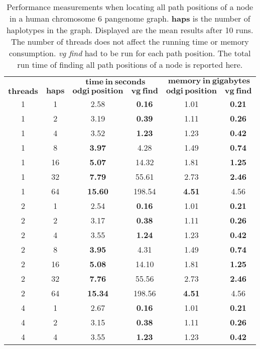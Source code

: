 \begin{table}[!ht]
	\centering
	\caption{\label{tab:position} Performance measurements when locating all path positions of a node in a human chromosome 6 pangenome graph. \textbf{haps} is the number of haplotypes in the graph. Displayed are the mean results after 10 runs. The number of threads does not affect the running time or memory consumption. \textit{vg find} had to be run for each path position. The total run time of finding all path positions of a node is reported here.}
	\begin{tabular}{@{}cccccc@{}}
		& & \multicolumn{2}{c}{$\mathbf{time\ in\ seconds}$} & \multicolumn{2}{c}{$\mathbf{memory\ in\ gigabytes}$} \\ \cmidrule(lr){3-4} \cmidrule(lr){5-6}
		{$\mathbf{threads}$} & {$\mathbf{haps}$} & {$\mathbf{odgi\ position}$} & {$\mathbf{vg\ find}$} & {$\mathbf{odgi\ position}$} & {$\mathbf{vg\ find}$} \\ \hline
		1 & 1 & 2.58 & \textbf{0.16} & 1.01 & \textbf{0.21} \\ 
		1 & 2 & 3.19 & \textbf{0.39} & 1.11 & \textbf{0.26} \\ 
		1 & 4 & 3.52 & \textbf{1.23} & 1.23 & \textbf{0.42} \\ 
		1 & 8 & \textbf{3.97} & 4.28 & 1.49 & \textbf{0.74} \\ 
		1 & 16 & \textbf{5.07} & 14.32 & 1.81 & \textbf{1.25} \\ 
		1 & 32 & \textbf{7.79} & 55.61 & 2.73 & \textbf{2.46} \\ 
		1 & 64 & \textbf{15.60} & 198.54 & \textbf{4.51} & 4.56 \\ \midrule
		2 & 1 & 2.54 & \textbf{0.16} & 1.01 & \textbf{0.21} \\ 
		2 & 2 & 3.17 & \textbf{0.38} & 1.11 & \textbf{0.26} \\ 
		2 & 4 & 3.55 & \textbf{1.24} & 1.23 & \textbf{0.42} \\ 
		2 & 8 & \textbf{3.95} & 4.31 & 1.49 & \textbf{0.74} \\ 
		2 & 16 & \textbf{5.08} & 14.10 & 1.81 & \textbf{1.25} \\ 
		2 & 32 & \textbf{7.76} & 55.56 & 2.73 & \textbf{2.46} \\ 
		2 & 64 & \textbf{15.34} & 198.56 & \textbf{4.51} & 4.56 \\ \midrule
		4 & 1 & 2.67 & \textbf{0.16} & 1.01 & \textbf{0.21} \\ 
		4 & 2 & 3.15 & \textbf{0.38} & 1.11 & \textbf{0.26} \\ 
		4 & 4 & 3.55 & \textbf{1.23} & 1.23 & \textbf{0.42} \\ 

\end{tabular}
\end{table}
